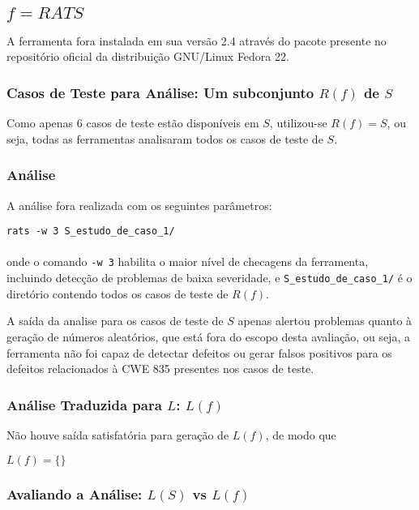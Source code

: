 \subsection{$f = RATS$}

A ferramenta fora instalada em sua versão 2.4 através do pacote presente no repositório oficial da distribuição GNU/Linux Fedora 22.

\subsubsection{Casos de Teste para Análise: Um subconjunto $R(f)$ de $S$}

Como apenas 6 casos de teste estão disponíveis em $S$, utilizou-se $R(f) = S$, ou seja, todas as ferramentas analisaram todos os casos de teste de $S$.

\subsubsection{Análise}

A análise fora realizada com os seguintes parâmetros:

\lstinline{rats -w 3 S_estudo_de_caso_1/}\\\\
onde o comando \lstinline{-w 3} habilita o maior nível de checagens da ferramenta, incluindo detecção de problemas de baixa severidade, e \lstinline{S_estudo_de_caso_1/} é o diretório contendo todos os casos de teste de $R(f)$.

A saída da analise para os casos de teste de $S$ apenas alertou problemas quanto à geração de números aleatórios, que está fora do escopo desta avaliação, ou seja, a ferramenta não foi capaz de detectar defeitos ou gerar falsos positivos para os defeitos relacionados à CWE 835 presentes nos casos de teste.

\subsubsection{Análise Traduzida para $L$: $L(f)$}

Não houve saída satisfatória para geração de $L(f)$, de modo que 

$L(f) = \lbrace\rbrace$

\subsubsection{Avaliando a Análise: $L(S)$ vs $L(f)$}

